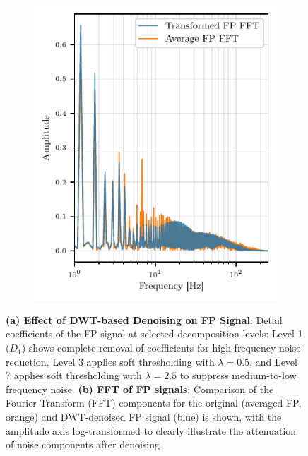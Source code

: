 \documentclass{report}
\begin{document}
\begin{figure}[H]
\begin{subfigure}[b]{0.4\textwidth}
                    \label{fig:fp_dwt}
                \end{subfigure}
                ~
                \begin{subfigure}[b]{0.45\textwidth}
                   \includegraphics[width=\textwidth,keepaspectratio]{plots/chapter_3/mea_sft_wavelet_comparison_fft.pdf}
                    \caption[Processed field potential]{}
                    \label{fig:fp_fft}
                \end{subfigure}
                \caption[Field Potential Signal Processing]{\textbf{(a) Effect of DWT-based Denoising on FP Signal}: Detail coefficients of the FP signal at selected decomposition levels: Level 1 (\(D_1\)) shows complete removal of coefficients for high-frequency noise reduction, Level 3 applies soft thresholding with \(\lambda = 0.5\), and Level 7 applies soft thresholding with \(\lambda = 2.5\) to suppress medium-to-low frequency noise. \textbf{(b) FFT of FP signals}: Comparison of the Fourier Transform (FFT) components for the original (averaged FP, orange) and DWT-denoised FP signal (blue) is shown, with the amplitude axis log-transformed to clearly illustrate the attenuation of noise components after denoising.}

\end{figure}
\end{document}
